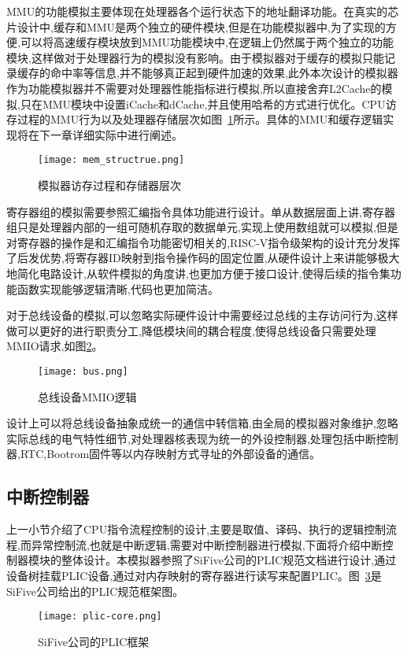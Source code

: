 MMU的功能模拟主要体现在处理器各个运行状态下的地址翻译功能。在真实的芯片设计中,缓存和MMU是两个独立的硬件模块,但是在功能模拟器中,为了实现的方便,可以将高速缓存模块放到MMU功能模块中,在逻辑上仍然属于两个独立的功能模块,这样做对于处理器行为的模拟没有影响。由于模拟器对于缓存的模拟只能记录缓存的命中率等信息,并不能够真正起到硬件加速的效果,此外本次设计的模拟器作为功能模拟器并不需要对处理器性能指标进行模拟,所以直接舍弃L2Cache的模拟,只在MMU模块中设置iCache和dCache,并且使用哈希的方式进行优化。CPU访存过程的MMU行为以及处理器存储层次如图~\ref{fig:mem_structrue}所示。具体的MMU和缓存逻辑实现将在下一章详细实际中进行阐述。
\begin{figure}[H]
  \centering
  \texttt{[image: mem\_structrue.png]}
  \caption{模拟器访存过程和存储器层次}
  \label{fig:mem_structrue}
\end{figure}


寄存器组的模拟需要参照汇编指令具体功能进行设计。单从数据层面上讲,寄存器组只是处理器内部的一组可随机存取的数据单元,实现上使用数组就可以模拟,但是对寄存器的操作是和汇编指令功能密切相关的,RISC-V指令级架构的设计充分发挥了后发优势,将寄存器ID映射到指令操作码的固定位置,从硬件设计上来讲能够极大地简化电路设计,从软件模拟的角度讲,也更加方便于接口设计,使得后续的指令集功能函数实现能够逻辑清晰,代码也更加简洁。


对于总线设备的模拟,可以忽略实际硬件设计中需要经过总线的主存访问行为,这样做可以更好的进行职责分工,降低模块间的耦合程度,使得总线设备只需要处理MMIO请求,如图\ref{fig:bus}。
\begin{figure}[H]
  \centering
  \texttt{[image: bus.png]}
  \caption{总线设备MMIO逻辑}
  \label{fig:bus}
\end{figure}


设计上可以将总线设备抽象成统一的通信中转信箱,由全局的模拟器对象维护,忽略实际总线的电气特性细节,对处理器核表现为统一的外设控制器,处理包括中断控制器,RTC,Bootrom固件等以内存映射方式寻址的外部设备的通信。

\clearpage
\subsection{中断控制器}
上一小节介绍了CPU指令流程控制的设计,主要是取值、译码、执行的逻辑控制流程,而异常控制流,也就是中断逻辑,需要对中断控制器进行模拟,下面将介绍中断控制器模块的整体设计。本模拟器参照了SiFive公司的PLIC规范文档进行设计,通过设备树挂载PLIC设备,通过对内存映射的寄存器进行读写来配置PLIC。图~\ref{fig:plic-core}是SiFive公司给出的PLIC规范框架图。
\begin{figure}[H]
    \centering
    \texttt{[image: plic-core.png]}
    \caption{SiFive公司的PLIC框架}
    \label{fig:plic-core}
\end{figure}


